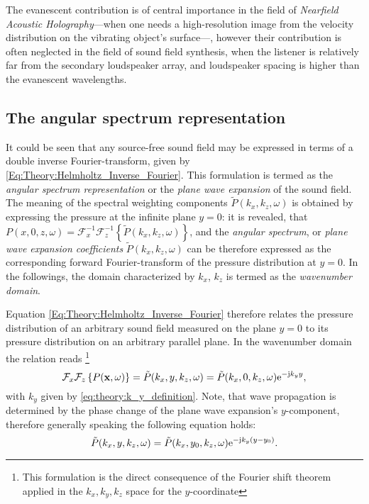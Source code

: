 %
The evanescent contribution is of central importance in the field of \emph{Nearfield Acoustic Holography}---when one needs a high-resolution image from the velocity distribution on the vibrating object's surface---, however their contribution is often neglected in the field of sound field synthesis, when the listener is relatively far from the secondary loudspeaker array, and loudspeaker spacing is higher than the evanescent wavelengths.

%
\subsection{The angular spectrum representation}
It could be seen that any source-free sound field may be expressed in terms of a double inverse Fourier-transform, given by \eqref{Eq:Theory:Helmholtz_Inverse_Fourier}.
This formulation is termed as the \emph{angular spectrum representation} \cite{Ahrens2010phd, Ahrens2012, Williams1999} or the \emph{plane wave expansion} \cite{Spors2005} of the sound field.
The meaning of the spectral weighting components $\tilde{P}(k_x,k_z,\omega)$ is obtained by expressing the pressure at the infinite plane $y=0$: it is revealed, that $P(x,0,z,\omega) = \mathcal{F}_x^{-1}\mathcal{F}_z^{-1} \left\{\tilde{P}(k_x,k_z, \omega)\right\}$,
and the \emph{angular spectrum}, or \emph{plane wave expansion coefficients} $\tilde{P}(k_x,k_z, \omega)$ can be therefore expressed as the corresponding forward Fourier-transform of the pressure distribution at $y=0$.
In the followings, the domain characterized by $k_x$, $k_z$ is termed as the \emph{wavenumber domain}.

Equation \eqref{Eq:Theory:Helmholtz_Inverse_Fourier} therefore relates the pressure distribution of an arbitrary sound field measured on the plane $y=0$ to its pressure distribution on an arbitrary parallel plane. 
In the wavenumber domain the relation reads
\footnote{This formulation is the direct consequence of the Fourier shift theorem applied in the $k_x, k_y, k_z$ space for the $y$-coordinate}
\begin{equation}
\mathcal{F}_x\mathcal{F}_z \left\{ P(\mathbf{x},\omega) \right\} = \tilde{P}(k_x,y,k_z,\omega) = \tilde{P}(k_x,0,k_z,\omega) \mathrm{e}^{-\mathrm{j} k_y y},
\label{Eq:Theory:Wave_field_extrapolation}
\end{equation}
with $k_y$ given by \eqref{eq:theory:k_y_definition}.
Note, that wave propagation is determined by the phase change of the plane wave expansion's $y$-component, therefore generally speaking the following equation holds:
\begin{equation}
\tilde{P}(k_x,y,k_z,\omega) = \tilde{P}(k_x,y_0,k_z,\omega) \mathrm{e}^{-\mathrm{j} k_y ( y - y_0 ) }.
\end{equation}

